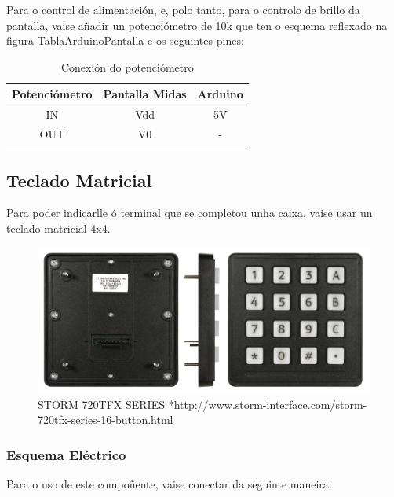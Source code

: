 \documentclass[11pt,twoside]{book}
\begin{document}
Para o control de alimentación, e, polo tanto, para o controlo de brillo da pantalla, vaise añadir un potenciómetro de 10k que ten o esquema reflexado na figura {TablaArduinoPantalla} e os seguintes pines:

\begin{table}[htbt]
\begin{center}
\begin{tabular}{|c|c|c|}
\hline
Potenciómetro & Pantalla Midas & Arduino\\
\hline
IN & Vdd & 5V \\
\hline
OUT & V0 & -\\
\hline
\end{tabular}
\caption{Conexión do potenciómetro}
\label{TablaPotenciometro}
\end{center}
\end{table}

\subsection{Teclado Matricial}

Para poder indicarlle ó terminal que se completou unha caixa, vaise usar un teclado matricial 4x4.

\begin{figure}[H]
	\begin{center}
		\includegraphics[width=12cm]{images/teclado_storm.jpg}
	\end{center}
	\caption{STORM 720TFX SERIES *http://www.storm-interface.com/storm-720tfx-series-16-button.html}
	\label{fig:TecladoStorm}
\end{figure}

\subsubsection{Esquema Eléctrico}

Para o uso de este compoñente, vaise conectar da seguinte maneira:
\end{document}
